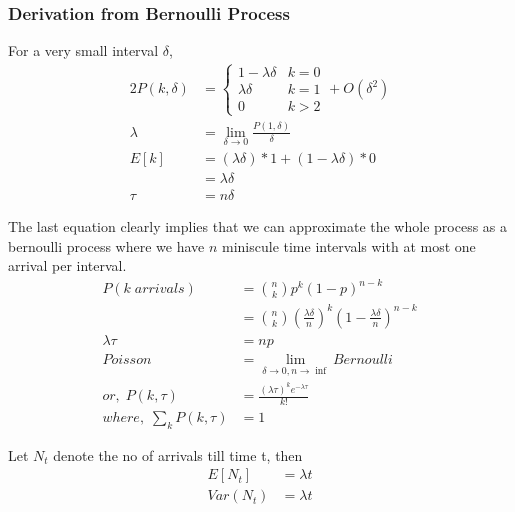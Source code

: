 \documentclass[../../probability-notes.tex]{subfiles}
\begin{document}
    \subsubsection{Derivation from Bernoulli Process}
    For a very small interval $\delta$,
    \begin{alignat*}{2}
        P(k, \delta) &= \begin{cases} 1-\lambda \delta &\mbox{$k = 0$}\\
                                     \lambda \delta &\mbox{$k = 1$}\\
                                     0 &\mbox{$k > 2$} \end{cases} + O(\delta^{2})\\
        \lambda &= \lim_{\delta \to 0}\frac{P(1,\delta)}{\delta} \tag*{arrival rate per unit time}\\
        E[k] &= (\lambda \delta) * 1 + (1-\lambda \delta) * 0\\
            &= \lambda \delta \\
        \tau &= n \delta
    \end{alignat*}
    
    The last equation clearly implies that we can approximate the whole process as a bernoulli process where we have $n$ miniscule time intervals with at most one arrival per interval.
    \begin{align*}
        P(k\; arrivals) &= \binom{n}{k} p^{k} (1-p)^{n-k} \\
            &= \binom{n}{k} (\frac{\lambda \delta}{n})^{k} (1 - \frac{\lambda \delta}{n})^{n-k}\\
        \lambda \tau &= np \tag*{or, arrival rate * time = E[arrivals]}\\
        Poisson &= \lim_{\delta \to 0, n \to \inf} Bernoulli\\
        or,\; P(k, \tau) &= \frac{(\lambda \tau)^{k} e^{-\lambda \tau}}{k!} \tag*{$k = 0,1, \cdots$, for a given $\tau$}\\
        where,\; \sum_{k} P(k, \tau) &= 1 \tag*{for a given $\tau$}
    \end{align*}

    Let $N_{t}$ denote the no of arrivals till time t, then
    \begin{align*}
        E[N_{t}] &= \lambda t\\
        Var(N_{t}) &= \lambda t
    \end{align*}
\end{document}
